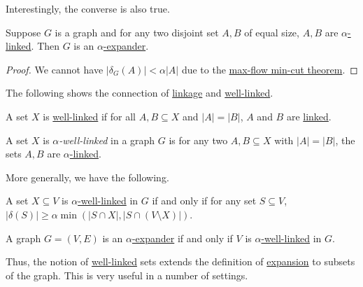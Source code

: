 Interestingly, the converse is also true.

\begin{lemma}\label{lma:linkage-expander}
	Suppose \(G\) is a graph and for any two disjoint set \(A, B\) of equal size, \(A, B\) are \hyperref[def:fractional-linkage]{\(\alpha \)-linked}. Then \(G\) is an \hyperref[def:expander]{\(\alpha \)-expander}.
\end{lemma}
\begin{proof}
	We cannot have \(\lvert \delta _G(A) \rvert < \alpha \lvert A \rvert \) due to the \hyperref[thm:max-flow-min-cut]{max-flow min-cut theorem}.
\end{proof}

The following shows the connection of \hyperref[def:linkage]{linkage} and \hyperref[def:well-linked]{well-linked}.

\begin{claim}
	A set \(X\) is \hyperref[def:well-linked]{well-linked} if for all \(A, B \subseteq X\) and \(\lvert A \rvert = \lvert B \rvert \), \(A\) and \(B\) are \hyperref[def:linkage]{linked}.
\end{claim}

\begin{definition}\label{def:fractional-well-linked}
	A set \(X\) is \emph{\(\alpha \)-well-linked} in a graph \(G\) is for any two \(A, B \subseteq X\) with \(\lvert A \rvert = \lvert B \rvert \), the sets \(A, B\) are \hyperref[def:fractional-linkage]{\(\alpha \)-linked}.
\end{definition}

More generally, we have the following.

\begin{lemma}
	A set \(X \subseteq V\) is \hyperref[def:fractional-well-linked]{\(\alpha \)-well-linked} in \(G\) if and only if for any set \(S \subseteq V\), \(\lvert \delta (S) \rvert \geq \alpha \min (\lvert S \cap X \rvert , \lvert S \cap (V\setminus X) \rvert )\).
\end{lemma}

\begin{corollary}
	A graph \(G = (V, E)\) is an \hyperref[def:expander]{\(\alpha \)-expander} if and only if \(V\) is \hyperref[def:fractional-well-linked]{\(\alpha \)-well-linked} in \(G\).
\end{corollary}

Thus, the notion of \hyperref[def:fractional-well-linked]{well-linked} sets extends the definition of \hyperref[def:expansion]{expansion} to subsets of the graph. This is very useful in a number of settings.

